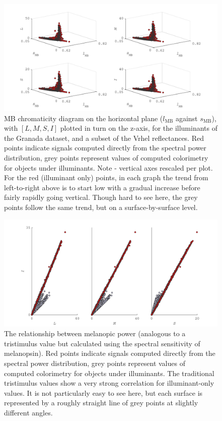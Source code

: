 \begin{figure}[htbp]
    \includegraphics[max width=\textwidth]{figs/comp/melcomp_1/level1sigspredictingColorimetry.pdf}
    \caption{\gls{MB} chromaticity diagram on the horizontal plane ($l_{\text{MB}}$ against $s_{\text{MB}}$), with $[L,M,S,I]$ plotted in turn on the z-axis, for the illuminants of the Granada dataset, and a subset of the Vrhel reflectances. Red points indicate signals computed directly from the spectral power distribution, grey points represent values of computed colorimetry for objects under illuminants. Note - vertical axes rescaled per plot. For the red (illuminant only) points, in each graph the trend from left-to-right above is to start low with a gradual increase before fairly rapidly going vertical. Though hard to see here, the grey points follow the same trend, but on a surface-by-surface level.}
    \label{fig:level1}
\end{figure} 

\begin{figure}[htbp]
    \includegraphics[max width=\textwidth]{figs/comp/melcomp_1/correlationBetweenLevel1Sigs.pdf}
    \caption{The relationship between melanopic power (analogous to a tristimulus value but calculated using the spectral sensitivity of melanopsin). Red points indicate signals computed directly from the spectral power distribution, grey points represent values of computed colorimetry for objects under illuminants.  The traditional tristimulus values show a very strong correlation for illuminant-only values. It is not particularly easy to see here, but each surface is represented by a roughly straight line of grey points at slightly different angles.}
    \label{fig:tristimCorrelation}
\end{figure} 

